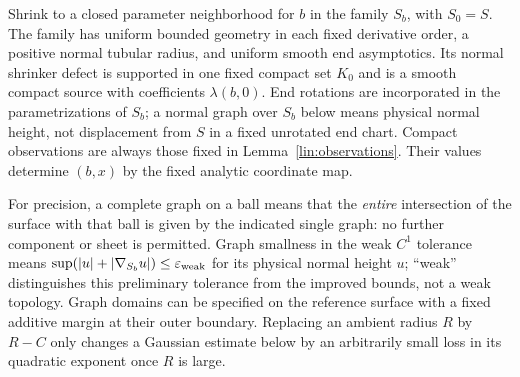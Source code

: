 Shrink to a closed parameter neighborhood for $b$ in the family $S_b$,
with $S_0=S$.  The family has uniform bounded geometry in each fixed
derivative order, a positive normal tubular radius, and uniform smooth
end asymptotics.  Its normal shrinker defect is supported in one fixed
compact set $K_0$ and is a smooth compact source with coefficients
$\lambda(b,0)$.  End rotations are incorporated in the parametrizations
of $S_b$; a normal graph over $S_b$ below means physical normal height,
not displacement from $S$ in a fixed unrotated end chart.  Compact
observations are always those fixed in Lemma~\ref{lin:observations}.
Their values determine $(b,x)$ by the fixed analytic coordinate map.

For precision, a complete graph on a ball means that the \emph{entire}
intersection of the surface with that ball is given by the indicated
single graph: no further component or sheet is permitted.  Graph
smallness in the weak $C^1$ tolerance means
$\sup(|u|+|\nabla_{S_b}u|)\le\varepsilon_{\rm weak}$ for its
physical normal height $u$; ``weak'' distinguishes this preliminary
tolerance from the improved bounds, not a weak topology.  Graph
domains can be specified on the reference surface with a fixed
additive margin at their outer boundary.  Replacing an ambient radius
$R$ by $R-C$ only changes a Gaussian estimate below by an arbitrarily
small loss in its quadratic exponent once $R$ is large.

